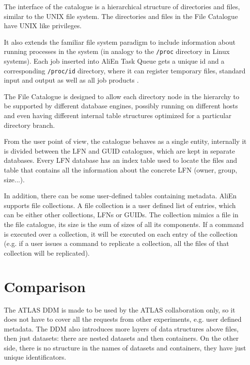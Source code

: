 The interface of the catalogue is a hierarchical structure of directories and
files, similar to the UNIX file system. The directories and files in the File
Catalogue have UNIX like privileges.

It also extends the familiar file system paradigm to include information about
running processes in the system (in analogy to the \texttt{/proc} directory in Linux
systems). Each job inserted into AliEn Task Queue gets a unique id and a
corresponding \texttt{/proc/id} directory, where it can register temporary files,
standard input and output as well as all job products \cite{AliEn1}.

The File Catalogue is designed to allow each directory node in the hierarchy to
be supported by different database engines, possibly running on different hosts
and even having different internal table structures optimized for a particular
directory branch. 

From the user point of view, the catalogue behaves as a single entity, internally
it is divided between the LFN and GUID catalogues, which are kept in separate
databases. Every LFN database has an index table used to locate the files and
table that contains all the information about the concrete LFN (owner, group,
size...).

In addition, there can be some user-defined tables containing metadata.
AliEn supports file collections.  A file collection is a user defined list of
entries, which can be either other collections, LFNs or GUIDs. The collection
mimics a file in the file catalogue, its size is the sum of sizes of
all its components. If a command is executed over a collection, it will be
executed on each entry of the collection (e.g. if a user issues a command to
replicate a collection, all the files of that collection will be replicated).

\section{Comparison}

The ATLAS DDM is made to be used by the ATLAS collaboration only, so it does not have to cover all the 
requests from other experiments, e.g. user defined metadata. The DDM also introduces more layers of data structures 
above files, then just datasets: there are nested datasets and then containers. On the other side, there is no
structure in the names of datasets and containers, they have just unique identificators. 

